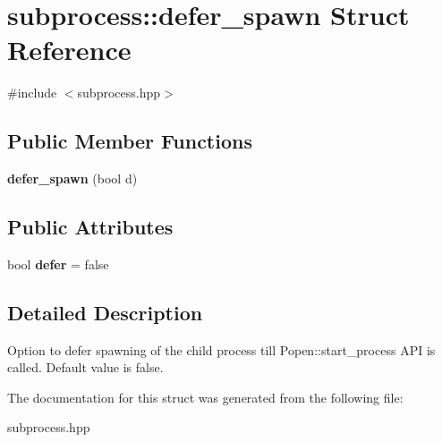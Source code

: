 \hypertarget{structsubprocess_1_1defer__spawn}{}\section{subprocess\+:\+:defer\+\_\+spawn Struct Reference}
\label{structsubprocess_1_1defer__spawn}


{\ttfamily \#include $<$subprocess.\+hpp$>$}

\subsection*{Public Member Functions}
\begin{DoxyCompactItemize}
\item 
\mbox{\label{structsubprocess_1_1defer__spawn_a97e4944b4c973c58d65318c38a6637e3}} 
{\bfseries defer\+\_\+spawn} (bool d)
\end{DoxyCompactItemize}
\subsection*{Public Attributes}
\begin{DoxyCompactItemize}
\item 
\mbox{\label{structsubprocess_1_1defer__spawn_a4686acc343f98c0d2beca266941c7984}} 
bool {\bfseries defer} = false
\end{DoxyCompactItemize}


\subsection{Detailed Description}
Option to defer spawning of the child process till {\ttfamily Popen\+::start\+\_\+process} A\+PI is called. Default value is false. 

The documentation for this struct was generated from the following file\+:\begin{DoxyCompactItemize}
\item 
subprocess.\+hpp\end{DoxyCompactItemize}
